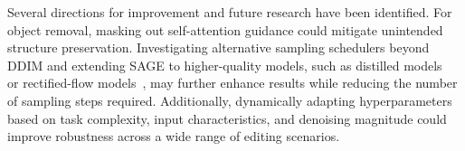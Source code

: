 {\modified{}Several directions for improvement and future research have been identified. For object removal, masking out self-attention guidance could mitigate unintended structure preservation. Investigating alternative sampling schedulers beyond DDIM and extending SAGE to higher-quality models, such as distilled models~\cite{meng2023distillation} or rectified-flow models~\cite{liu2023flow,deng2024fireflow}, may further enhance results while reducing the number of sampling steps required. Additionally, dynamically adapting hyperparameters based on task complexity, input characteristics, and denoising magnitude could improve robustness across a wide range of editing scenarios.}
